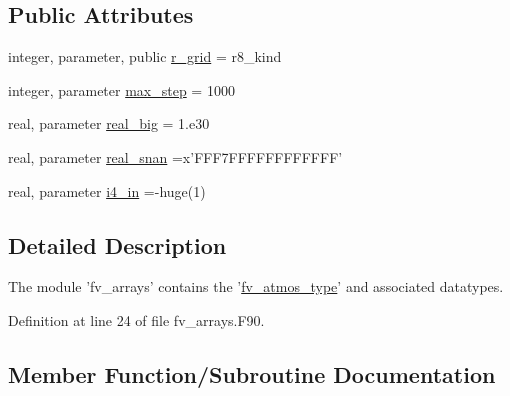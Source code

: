 \subsection*{Public Attributes}
\begin{DoxyCompactItemize}
\item 
integer, parameter, public \hyperlink{classfv__arrays__mod_ab0ba8527d270f349a84fa0a330be1923}{r\-\_\-grid} = r8\-\_\-kind
\item 
integer, parameter \hyperlink{classfv__arrays__mod_a9e487a715273ca3c6572693756bcec1b}{max\-\_\-step} = 1000
\item 
real, parameter \hyperlink{classfv__arrays__mod_aa61534ed3f1d97da89f9e2ff98a31279}{real\-\_\-big} = 1.e30
\item 
real, parameter \hyperlink{classfv__arrays__mod_ac263153323954d48a2ba22738897b14c}{real\-\_\-snan} =x'F\-F\-F7\-F\-F\-F\-F\-F\-F\-F\-F\-F\-F\-F\-F'
\item 
real, parameter \hyperlink{classfv__arrays__mod_a4e97836bef22972e458e71ab3930b62c}{i4\-\_\-in} =-\/huge(1)
\end{DoxyCompactItemize}


\subsection{Detailed Description}
The module 'fv\-\_\-arrays' contains the '\hyperlink{structfv__arrays__mod_1_1fv__atmos__type}{fv\-\_\-atmos\-\_\-type}' and associated datatypes. 

Definition at line 24 of file fv\-\_\-arrays.\-F90.



\subsection{Member Function/\-Subroutine Documentation}
